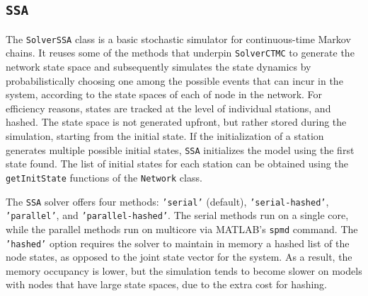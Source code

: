 \subsection{\texttt{SSA}}
The \texttt{SolverSSA} class is a basic stochastic simulator for continuous-time Markov chains. It reuses some of the methods that underpin \texttt{SolverCTMC} to generate the network state space and subsequently simulates the state dynamics by probabilistically choosing one among the possible events that can incur in the system, according to the state spaces of each of node in the network. For efficiency reasons, states are tracked at the level of individual stations, and hashed. The state space is not generated upfront, but rather stored during the simulation, starting from the initial state. If the initialization of a station generates multiple possible initial states, \texttt{SSA} initializes the model using the first state found. The list of initial states for each station can be obtained using the \texttt{getInitState} functions of the \texttt{Network} class.

The \texttt{SSA} solver offers four methods: \texttt{'serial'} (default), \texttt{'serial-hashed'}, \texttt{'parallel'}, and \texttt{'parallel-hashed'}. The serial methods run on a single core, while the parallel methods run on multicore via MATLAB's \texttt{spmd} command. The \texttt{'hashed'} option requires the solver to maintain in memory a hashed list of the node states, as opposed to the joint state vector for the system. As a result, the memory occupancy is lower, but the simulation tends to become slower on models with nodes that have large state spaces, due to the extra cost for hashing. 



